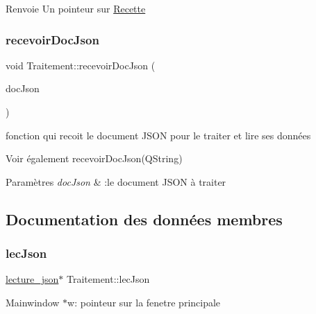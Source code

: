\begin{DoxyReturn}{Renvoie}
Un pointeur sur \hyperlink{classRecette}{Recette} 
\end{DoxyReturn}
\mbox{\label{classTraitement_a7bbc7e2034b55a9de14c010be7d3de11}} 
\subsubsection{\texorpdfstring{recevoir\+Doc\+Json}{recevoirDocJson}}
{\footnotesize\ttfamily void Traitement\+::recevoir\+Doc\+Json (\begin{DoxyParamCaption}\item[{Q\+Json\+Document}]{doc\+Json }\end{DoxyParamCaption})\hspace{0.3cm}{\ttfamily [slot]}}



fonction qui recoit le document J\+S\+ON pour le traiter et lire ses données 

\begin{DoxySeeAlso}{Voir également}
recevoir\+Doc\+Json(\+Q\+String) 
\end{DoxySeeAlso}

\begin{DoxyParams}{Paramètres}
{\em doc\+Json} & \+:le document J\+S\+ON à traiter \\
\hline
\end{DoxyParams}


\subsection{Documentation des données membres}
\mbox{\label{classTraitement_ac7e6ff3bfc54975b1c8831a2ad8fc9a4}} 
\subsubsection{\texorpdfstring{lec\+Json}{lecJson}}
{\footnotesize\ttfamily \hyperlink{classlecture__json}{lecture\+\_\+json}$\ast$ Traitement\+::lec\+Json\hspace{0.3cm}{\ttfamily [private]}}

Mainwindow $\ast$w\+: pointeur sur la fenetre principale \mbox{\label{classTraitement_afc8ac78bded6d17a86323544aa00d91b}} 
